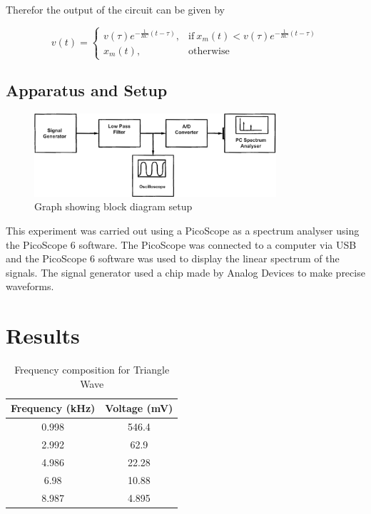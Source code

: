 \documentclass[12pt]{article}
\begin{document}
Therefor the output of the circuit can be given by

\begin{equation}
    v(t) = 
    \begin{cases}
        v(\tau)e^{-\frac{1}{RC}(t-\tau)}, & \text{if} \ x_m(t) < v(\tau)e^{-\frac{1}{RC}(t-\tau)} \\
        x_m(t), & \text{otherwise}
    \end{cases}
    \label{eq:8}
\end{equation}

\subsection{Apparatus and Setup}

\begin{figure}[h]
    \centering
    \includegraphics[width=0.8\textwidth]{setup_diagram.png}
    \caption{Graph showing block diagram setup}
    \label{fig:setup}
\end{figure}

This experiment was carried out using a PicoScope as a spectrum analyser using the PicoScope 6 software. The PicoScope was connected to a computer via USB and the PicoScope 6 software was used to display the linear spectrum of the signals.
The signal generator used a chip made by Analog Devices to make precise waveforms.



\section{Results}

\begin{table}[h]
    \centering
    \caption{Frequency composition for Triangle Wave}
    \begin{tabular}{|c|c|}
    \hline
    Frequency (kHz) & Voltage (mV) \\ \hline
    0.998           & 546.4        \\
    2.992           & 62.9         \\
    4.986           & 22.28        \\
    6.98            & 10.88        \\
    8.987           & 4.895        \\ \hline
    \end{tabular}
\end{table}
\end{document}
